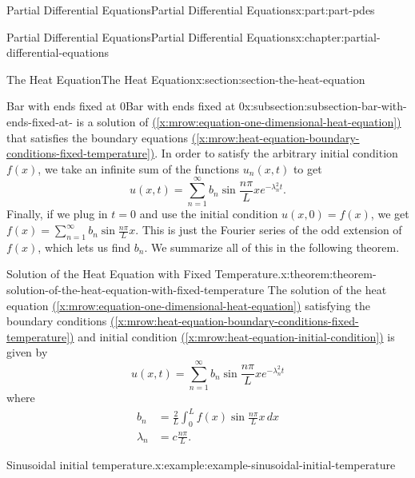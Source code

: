 \documentclass[twoside,10pt,]{book}
\newcommand{\xreffont}{\relax}
\numberwithin{equation}{part}
\newcommand{\amp}{&}
\begin{document}
\begin{partptx}{Partial Differential Equations}{}{Partial Differential Equations}{}{}{x:part:part-pdes}
\begin{chapterptx}{Partial Differential Equations}{}{Partial Differential Equations}{}{}{x:chapter:partial-differential-equations}
\begin{sectionptx}{The Heat Equation}{}{The Heat Equation}{}{}{x:section:section-the-heat-equation}
\begin{subsectionptx}{Bar with ends fixed at \(0\)}{}{Bar with ends fixed at \(0\)}{}{}{x:subsection:subsection-bar-with-ends-fixed-at-}
is a solution of \hyperref[x:mrow:equation-one-dimensional-heat-equation]{({\xreffont\ref{x:mrow:equation-one-dimensional-heat-equation}})} that satisfies the boundary equations \hyperref[x:mrow:heat-equation-boundary-conditions-fixed-temperature]{({\xreffont\ref{x:mrow:heat-equation-boundary-conditions-fixed-temperature}})}. In order to satisfy the arbitrary initial condition \(f(x)\), we take an infinite sum of the functions \(u_{n}(x,t)\) to get%
%
\begin{equation*}
u(x,t) = \sum_{n=1}^{\infty}b_{n}\sin\frac{n\pi}{L}x e^{-\lambda^{2}_{n}t}.
\end{equation*}
Finally, if we plug in \(t=0\) and use the initial condition \(u(x,0) = f(x)\), we get \(f(x) = \sum_{n=1}^{\infty}b_{n}\sin\frac{n\pi}{L}x\). This is just the Fourier series of the odd extension of \(f(x)\), which lets us find \(b_{n}\). We summarize all of this in the following theorem.%
\begin{theorem}{Solution of the Heat Equation with Fixed Temperature.}{}{x:theorem:theorem-solution-of-the-heat-equation-with-fixed-temperature}%
%
The solution of the heat equation \hyperref[x:mrow:equation-one-dimensional-heat-equation]{({\xreffont\ref{x:mrow:equation-one-dimensional-heat-equation}})} satisfying the boundary conditions \hyperref[x:mrow:heat-equation-boundary-conditions-fixed-temperature]{({\xreffont\ref{x:mrow:heat-equation-boundary-conditions-fixed-temperature}})} and initial condition \hyperref[x:mrow:heat-equation-initial-condition]{({\xreffont\ref{x:mrow:heat-equation-initial-condition}})} is given by%
\begin{equation}
u(x,t) = \sum_{n=1}^{\infty}b_{n}\sin\frac{n\pi}{L}x e^{-\lambda^{2}_{n}t}\label{x:men:heat-equation-fixed-ends-solution}
\end{equation}
where%
\begin{align}
b_{n} \amp = \frac{2}{L}\int_{0}^{L}f(x)\sin\frac{n\pi}{L}x\,dx \label{x:mrow:heat-equation-fixed-ends-solution-coeff}\\
\lambda_{n} \amp = c\frac{n\pi}{L}. \label{x:mrow:heat-equation-fixed-ends-solution-exponent}
\end{align}
%
\end{theorem}
\begin{example}{Sinusoidal initial temperature.}{x:example:example-sinusoidal-initial-temperature}%

\end{example}
\end{subsectionptx}
\end{sectionptx}
\end{chapterptx}
\end{partptx}
\end{document}
